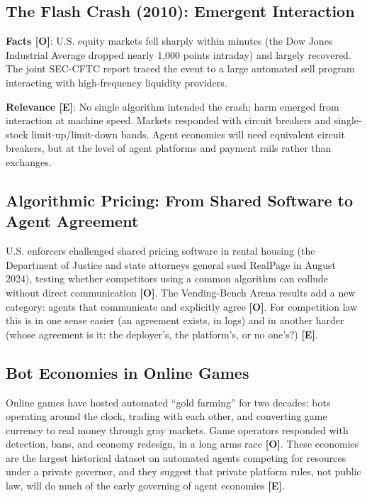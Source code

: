 \documentclass[11pt,letterpaper]{article}
\begin{document}
\subsection{The Flash Crash (2010): Emergent Interaction}

\begin{casebox}
\textbf{Facts [O]}: U.S. equity markets fell sharply within minutes (the Dow Jones Industrial Average dropped nearly 1,000 points intraday) and largely recovered. The joint SEC-CFTC report traced the event to a large automated sell program interacting with high-frequency liquidity providers.

\textbf{Relevance [E]}: No single algorithm intended the crash; harm emerged from interaction at machine speed. Markets responded with circuit breakers and single-stock limit-up/limit-down bands. Agent economies will need equivalent circuit breakers, but at the level of agent platforms and payment rails rather than exchanges.
\end{casebox}

\subsection{Algorithmic Pricing: From Shared Software to Agent Agreement}

U.S. enforcers challenged shared pricing software in rental housing (the Department of Justice and state attorneys general sued RealPage in August 2024), testing whether competitors using a common algorithm can collude without direct communication \textbf{[O]}. The Vending-Bench Arena results add a new category: agents that communicate and explicitly agree \textbf{[O]}. For competition law this is in one sense easier (an agreement exists, in logs) and in another harder (whose agreement is it: the deployer's, the platform's, or no one's?) \textbf{[E]}.

\subsection{Bot Economies in Online Games}

Online games have hosted automated ``gold farming'' for two decades: bots operating around the clock, trading with each other, and converting game currency to real money through gray markets. Game operators responded with detection, bans, and economy redesign, in a long arms race \textbf{[O]}. These economies are the largest historical dataset on automated agents competing for resources under a private governor, and they suggest that private platform rules, not public law, will do much of the early governing of agent economies \textbf{[E]}.
\end{document}

